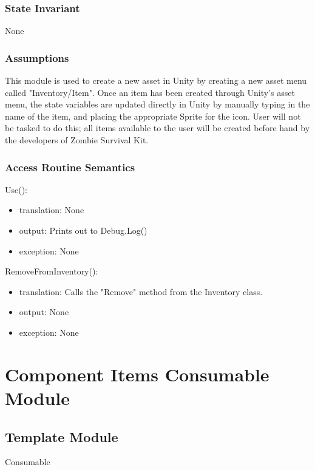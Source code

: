 \documentclass[12pt]{article}
\begin{document}
\subsubsection* {State Invariant}

None

\subsubsection* {Assumptions}

This module is used to create a new asset in Unity by creating a new asset menu called "Inventory/Item". Once an item has been created through Unity's asset menu, the state variables are updated directly in Unity by manually typing in the name of the item, and placing the appropriate Sprite for the icon. User will not be tasked to do this; all items available to the user will be created before hand by the developers of Zombie Survival Kit.

\subsubsection* {Access Routine Semantics}

\noindent Use():
\begin{itemize}
\item translation: None
\item output: Prints out to Debug.Log()
\item exception: None
\end{itemize}

\noindent RemoveFromInventory():
\begin{itemize}
\item translation: Calls the "Remove" method from the Inventory class.
\item output: None
\item exception: None
\end{itemize}

\newpage

\section* {Component Items Consumable Module}

\subsection*{Template Module}

Consumable
\end{document}
